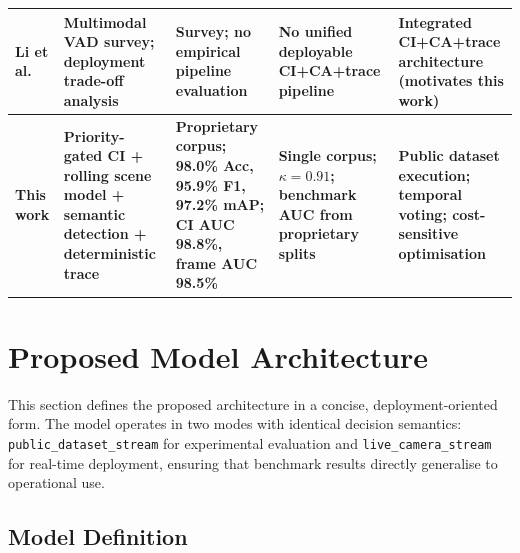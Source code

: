\documentclass[a4paper,fleqn]{cas-dc}
\begin{document}
\begin{table}[t]
\begin{tabularx}{\textwidth}{p{2.2cm} X X X X}
Li et al.~\citep{li2024multimodal}
  & Multimodal VAD survey; deployment trade-off analysis
  & Survey; no empirical pipeline evaluation
  & No unified deployable CI+CA+trace pipeline
  & Integrated CI+CA+trace architecture (motivates this work) \\
 
\midrule
 
\textbf{This work}
  & \textbf{Priority-gated CI + rolling scene model + semantic detection + deterministic trace}
  & \textbf{Proprietary corpus; 98.0\% Acc, 95.9\% F1, 97.2\% mAP; CI AUC 98.8\%, frame AUC 98.5\%}
  & \textbf{Single corpus; $\kappa{=}0.91$; benchmark AUC from proprietary splits}
  & \textbf{Public dataset execution; temporal voting; cost-sensitive optimisation} \\
 
\bottomrule
\end{tabularx}
\end{table}
\FloatBarrier
\section{Proposed Model Architecture}
\label{sec:proposedmodel}
 
This section defines the proposed architecture in a concise, deployment-oriented form. The model operates in two modes with identical decision semantics: \texttt{public\_dataset\_stream} for experimental evaluation and \texttt{live\_camera\_stream} for real-time deployment, ensuring that benchmark results directly generalise to operational use.
 
\FloatBarrier
\subsection{Model Definition}
\label{sec:model}
 
\end{document}
